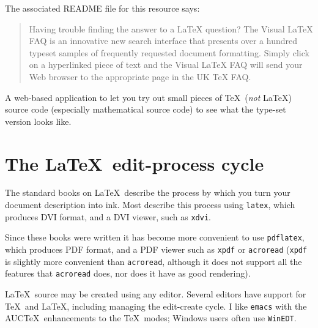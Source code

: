 \documentclass[authoryearcitations]{UoYCSproject}
\begin{document}
\begin{description}

  The associated README file for this resource says:
  \begin{quote}
    Having trouble finding the answer to a LaTeX question?  The Visual
    LaTeX FAQ is an innovative new search interface that presents over
    a hundred typeset samples of frequently requested document
    formatting.  Simply click on a hyperlinked piece of text and the
    Visual LaTeX FAQ will send your Web browser to the appropriate
    page in the UK TeX FAQ.
  \end{quote}


A web-based application to let you try out small pieces of \TeX\
(\emph{not} \LaTeX) source code (especially mathematical source code)
to see what the type-set version looks like.
\end{description}

\cleardoublepage
\chapter{The \LaTeX\ edit-process cycle}
\label{cha:editprocess}

The standard books on \LaTeX\ describe the process by which you turn
your document description into ink.  Most describe this process using
\lstinline|latex|, which produces DVI format, and a DVI viewer, such
as \lstinline|xdvi|.

Since these books were written it has become more convenient to use
\lstinline|pdflatex|, which produces PDF format, and a PDF viewer such
as \lstinline|xpdf| or \lstinline|acroread| (\lstinline|xpdf| is
slightly more convenient than \lstinline|acroread|, although it does
not support all the features that \lstinline|acroread| does, nor does
it have as good rendering).

\LaTeX\ source may be created using any editor.  Several editors have
support for \TeX\ and \LaTeX, including managing the edit-create
cycle.  I like \lstinline|emacs| with the AUC\TeX\ enhancements to the
\TeX\ modes; Windows users often use \lstinline|WinEDT|.
\end{document}

